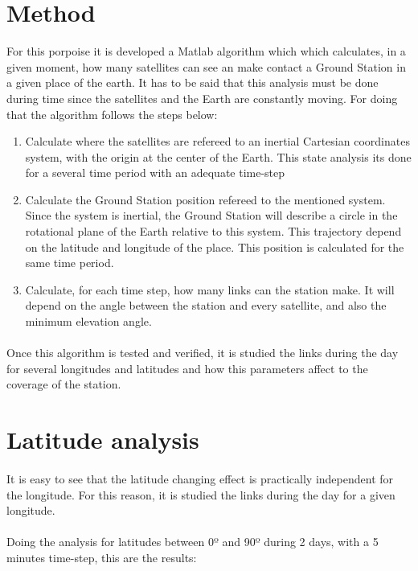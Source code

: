 \documentclass[12pt,a4paper]{report}
\begin{document}
\section{Method}
For this porpoise it is developed a Matlab algorithm which which calculates, in a given moment, how many satellites can see an make contact a Ground Station in a given place of the earth. It has to be said that this analysis must be done during time since the satellites and the Earth are constantly moving. For doing that the algorithm follows the steps below:
\begin{enumerate}
\item Calculate where the satellites are refereed to an inertial Cartesian coordinates system, with the origin at the center of the Earth. This state analysis its done for a several time period with an adequate time-step
\item Calculate the Ground Station position refereed to the mentioned system. Since the system is inertial, the Ground Station will describe a circle in the rotational plane of the Earth relative to this system. This trajectory depend on the latitude and longitude of the place. This position is calculated for the same time period.
\item Calculate, for each time step, how many links can the station make. It will depend on the angle between the station and every satellite, and also the minimum elevation angle.
\end{enumerate}
\paragraph{}
Once this algorithm is tested and verified, it is studied the links during the day for several longitudes and latitudes and how this parameters affect to the coverage of the station.

\section{Latitude analysis}
\paragraph{}
It is easy to see that the latitude changing effect is practically independent for the longitude. For this reason, it is studied the links during the day for a given longitude. 
\paragraph{}
Doing the analysis for latitudes between 0º and 90º during 2 days, with a 5 minutes time-step, this are the results:
\end{document}

